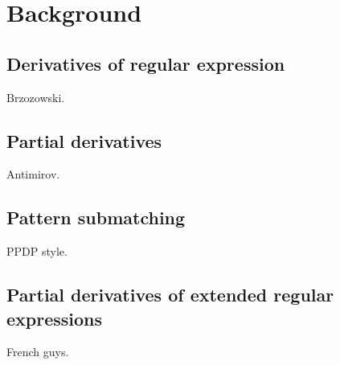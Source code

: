 \chapter{Background}

\section{Derivatives of regular expression}

Brzozowski.

\section{Partial derivatives}

Antimirov.

\section{Pattern submatching}

PPDP style.

\section{Partial derivatives of extended regular expressions}

French guys.


